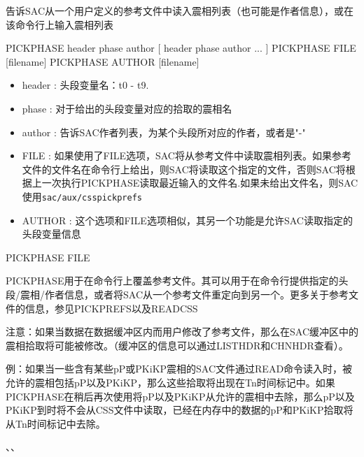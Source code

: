 \label{cmd:pickphase}

告诉SAC从一个用户定义的参考文件中读入震相列表（也可能是作者信息），或在该命令行上输入震相列表

\begin{SACSTX}
PICKPHASE header phase author [ header phase author ... ]
PICKPHASE FILE [filename]
PICKPHASE AUTHOR [filename]
\end{SACSTX}

\begin{itemize}
\item header : 头段变量名：t0 - t9. 
\item phase : 对于给出的头段变量对应的拾取的震相名 
\item author : 告诉SAC作者列表，为某个头段所对应的作者，或者是"-" 
\item FILE : 如果使用了FILE选项，SAC将从参考文件中读取震相列表。如果参考文件的文件名在命令行上给出，则SAC将读取这个指定的文件，否则SAC将根据上一次执行PICKPHASE读取最近输入的文件名.如果未给出文件名，则SAC使用\texttt{sac/aux/csspickprefs}
\item AUTHOR : 这个选项和FILE选项相似，其另一个功能是允许SAC读取指定的头段变量信息
\end{itemize}

PICKPHASE FILE

PICKPHASE用于在命令行上覆盖参考文件。其可以用于在命令行提供指定的头段/震相/作者信息，或者将SAC从一个参考文件重定向到另一个。更多关于参考文件的信息，参见PICKPREFS以及READCSS

注意：如果当数据在数据缓冲区内而用户修改了参考文件，那么在SAC缓冲区中的震相拾取将可能被修改。（缓冲区的信息可以通过LISTHDR和CHNHDR查看）。

例：如果当一些含有某些pP或PKiKP震相的SAC文件通过READ命令读入时，被允许的震相包括pP以及PKiKP，那么这些拾取将出现在Tn时间标记中。如果PICKPHASE在稍后再次使用将pP以及PKiKP从允许的震相中去除，那么pP以及PKiKP到时将不会从CSS文件中读取，已经在内存中的数据的pP和PKiKP拾取将从Tn时间标记中去除。

、、
